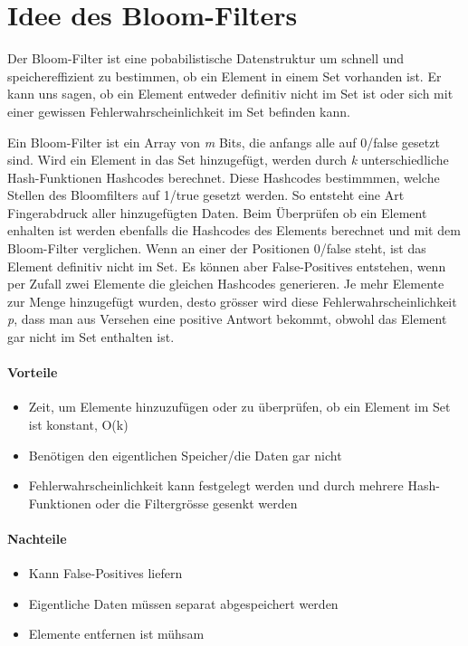\documentclass[12pt]{article}
\begin{document}
\maketitle

\section{Idee des Bloom-Filters}
Der Bloom-Filter ist eine pobabilistische Datenstruktur um schnell und speichereffizient zu bestimmen, ob ein Element in einem Set vorhanden ist. Er kann uns sagen, ob ein Element entweder definitiv nicht im Set ist oder sich mit einer gewissen Fehlerwahrscheinlichkeit im Set befinden kann.

Ein Bloom-Filter ist ein Array von \textit{m} Bits, die anfangs alle auf 0/false gesetzt sind. Wird ein Element in das Set hinzugefügt, werden durch \textit{k} unterschiedliche Hash-Funktionen Hashcodes berechnet. Diese Hashcodes bestimmmen, welche Stellen des Bloomfilters auf 1/true gesetzt werden. So entsteht eine Art Fingerabdruck aller hinzugefügten Daten. Beim Überprüfen ob ein Element enhalten ist werden ebenfalls die Hashcodes des Elements berechnet und mit dem Bloom-Filter verglichen. Wenn an einer der Positionen 0/false steht, ist das Element definitiv nicht im Set. Es können aber False-Positives entstehen, wenn per Zufall zwei Elemente die gleichen Hashcodes generieren.  Je mehr Elemente zur Menge hinzugefügt wurden, desto grösser wird diese Fehlerwahrscheinlichkeit \textit{p}, dass man aus Versehen eine positive Antwort bekommt, obwohl das Element gar nicht im Set enthalten ist.


\paragraph{Vorteile}
\begin{itemize}
\item Zeit, um  Elemente hinzuzufügen oder zu überprüfen, ob ein Element im Set ist konstant, O(k)
\item Benötigen den eigentlichen Speicher/die Daten gar nicht
\item Fehlerwahrscheinlichkeit kann festgelegt werden und durch mehrere Hash-Funktionen oder die Filtergrösse gesenkt werden
\end{itemize}

\paragraph{Nachteile}
\begin{itemize}
\item Kann False-Positives liefern
\item Eigentliche Daten müssen separat abgespeichert werden
\item Elemente entfernen ist mühsam
\end{itemize}
\end{document}
